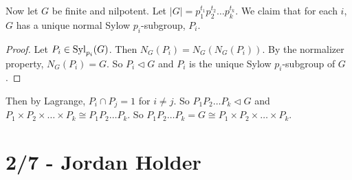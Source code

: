\documentclass{report}
\begin{document}
Now let $G$ be finite and nilpotent. Let $|G| = p_1^{t_1}p_2^{t_2}\ldots p_k^{t_k}$. We claim that for each $i$, $G$ has a unique normal Sylow $p_i$-subgroup, $P_i$.
\begin{proof}
    Let $P_i \in \operatorname{Syl}_{p_i}(G)$. Then $N_G(P_i) = N_G(N_G(P_i))$. By the normalizer property, $N_G(P_i) = G$. So $P_i \lhd G$ and $P_i$ is the unique Sylow $p_i$-subgroup of $G$.
\end{proof}
Then by Lagrange, $P_i \cap P_j = 1$ for $i \neq j$. So $P_1P_2\ldots P_k \lhd G$ and $P_1 \times P_2 \times \ldots \times P_k \cong P_1P_2\ldots P_k$. So $P_1P_2 \ldots P_k = G \cong P_1 \times P_2 \times \ldots \times P_k$.

\section{2/7 - Jordan Holder}
\end{document}
